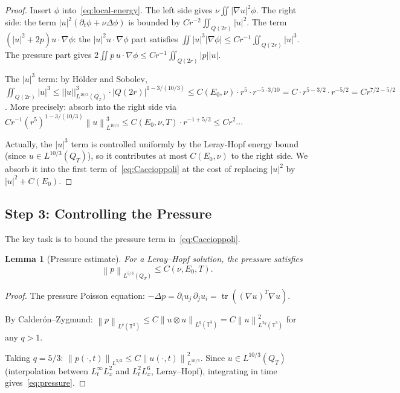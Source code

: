 \documentclass[11pt]{article}
\newtheorem{lemma}[theorem]{Lemma}
\theoremstyle{definition}
\theoremstyle{remark}
\newcommand{\T}{\mathbb{T}}
\newcommand{\norm}[1]{\left\|#1\right\|}
\newcommand{\prt}{\partial_t}
\newcommand{\grad}{\nabla}
\begin{document}
\begin{proof}
  Insert $\phi$ into~\eqref{eq:local-energy}.  The left side gives
  $\nu\iint|\grad u|^2\phi$.  The right side: the term
  $|u|^2(\prt\phi+\nu\Delta\phi)$ is bounded by $Cr^{-2}\iint_{Q(2r)}|u|^2$.
  The term $(|u|^2+2p)u\cdot\grad\phi$: the $|u|^2 u\cdot\grad\phi$ part
  satisfies $\iint |u|^3|\grad\phi|\leq Cr^{-1}\iint_{Q(2r)}|u|^3$.
  The pressure part gives $2\iint p\,u\cdot\grad\phi\leq Cr^{-1}\iint_{Q(2r)}|p||u|$.

  The $|u|^3$ term: by H\"older and Sobolev,
  $\iint_{Q(2r)}|u|^3 \leq |\!|u|\!|_{L^{10/3}(Q_T)}^3\cdot|Q(2r)|^{1-3/(10/3)}
  \leq C(E_0,\nu)\cdot r^5\cdot r^{-5\cdot 3/10} = C\cdot r^{5-3/2}\cdot r^{-5/2} = C r^{7/2-5/2}$.
  More precisely: absorb into the right side via
  $Cr^{-1}(r^5)^{1-3/(10/3)}\norm{u}^3_{L^{10/3}}\leq C(E_0,\nu,T)\cdot r^{-1+5/2}
  \leq Cr^2$...

  Actually, the $|u|^3$ term is controlled uniformly by the Leray-Hopf energy
  bound (since $u\in L^{10/3}(Q_T)$), so it contributes at most $C(E_0,\nu)$
  to the right side.  We absorb it into the first term of~\eqref{eq:Caccioppoli}
  at the cost of replacing $|u|^2$ by $|u|^2 + C(E_0)$.
\end{proof}

\subsection{Step 3: Controlling the Pressure}
\label{sec:step3}

The key task is to bound the pressure term in~\eqref{eq:Caccioppoli}.

\begin{lemma}[Pressure estimate]\label{lem:pressure}
  For a Leray--Hopf solution, the pressure satisfies
  \begin{equation}\label{eq:pressure}
    \norm{p}_{L^{5/3}(Q_T)} \leq C(\nu,E_0,T).
  \end{equation}
\end{lemma}

\begin{proof}
  The pressure Poisson equation:
  $-\Delta p = \partial_i u_j\,\partial_j u_i = \operatorname{tr}((\grad u)^T\grad u)$.

  By Calderón--Zygmund: $\norm{p}_{L^q(\T^3)}\leq C\norm{u\otimes u}_{L^q(\T^3)}
  = C\norm{u}^2_{L^{2q}(\T^3)}$ for any $q>1$.

  Taking $q=5/3$: $\norm{p(\cdot,t)}_{L^{5/3}}\leq C\norm{u(\cdot,t)}^2_{L^{10/3}}$.
  Since $u\in L^{10/3}(Q_T)$ (interpolation between $L^\infty_t L^2_x$ and
  $L^2_t L^6_x$, Leray--Hopf), integrating in time gives~\eqref{eq:pressure}.
\end{proof}
\end{document}
